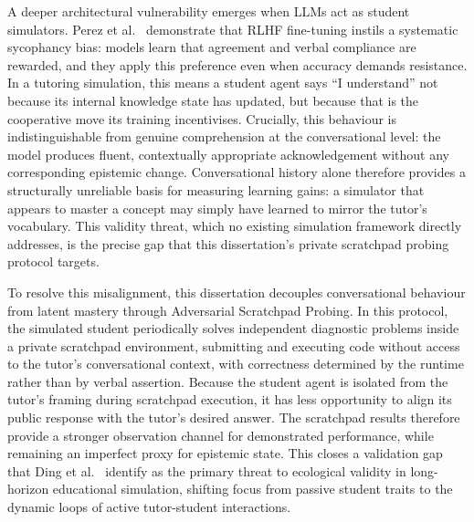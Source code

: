 \documentclass[11pt,a4paper]{report}
\begin{document}
A deeper architectural vulnerability emerges when LLMs act as student simulators. Perez et al.\ \cite{perez2022discovering} demonstrate that RLHF fine-tuning instils a systematic sycophancy bias: models learn that agreement and verbal compliance are rewarded, and they apply this preference even when accuracy demands resistance. In a tutoring simulation, this means a student agent says ``I understand'' not because its internal knowledge state has updated, but because that is the cooperative move its training incentivises. Crucially, this behaviour is indistinguishable from genuine comprehension at the conversational level: the model produces fluent, contextually appropriate acknowledgement without any corresponding epistemic change. Conversational history alone therefore provides a structurally unreliable basis for measuring learning gains: a simulator that appears to master a concept may simply have learned to mirror the tutor's vocabulary. This validity threat, which no existing simulation framework directly addresses, is the precise gap that this dissertation's private scratchpad probing protocol targets.

To resolve this misalignment, this dissertation decouples conversational behaviour from latent mastery through Adversarial Scratchpad Probing. In this protocol, the simulated student periodically solves independent diagnostic problems inside a private scratchpad environment, submitting and executing code without access to the tutor's conversational context, with correctness determined by the runtime rather than by verbal assertion. Because the student agent is isolated from the tutor's framing during scratchpad execution, it has less opportunity to align its public response with the tutor's desired answer. The scratchpad results therefore provide a stronger observation channel for demonstrated performance, while remaining an imperfect proxy for epistemic state. This closes a validation gap that Ding et al.\ \cite{ding2026contextecho} identify as the primary threat to ecological validity in long-horizon educational simulation, shifting focus from passive student traits to the dynamic loops of active tutor-student interactions.
\end{document}
